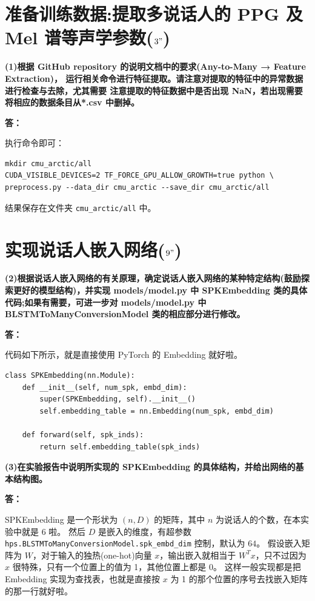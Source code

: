 \documentclass[degree=project,degree-type=project,cjk-font=noto]{thuthesis}
\begin{document}
\section{准备训练数据:提取多说话人的 PPG 及 Mel 谱等声学参数($3"$)}

\textbf{(1)根据 GitHub repository 的说明文档中的要求(Any-to-Many → Feature Extraction)， 运行相关命令进行特征提取。请注意对提取的特征中的异常数据进行检查与去除，尤其需要 注意提取的特征数据中是否出现 NaN，若出现需要将相应的数据条目从*.csv 中删掉。}

\textbf{答：}

执行命令即可：

  \begin{verbatim}
mkdir cmu_arctic/all
CUDA_VISIBLE_DEVICES=2 TF_FORCE_GPU_ALLOW_GROWTH=true python \
preprocess.py --data_dir cmu_arctic --save_dir cmu_arctic/all
\end{verbatim}

结果保存在文件夹 \texttt{cmu\_arctic/all} 中。

\section{实现说话人嵌入网络($9"$)}

\textbf{(2)根据说话人嵌入网络的有关原理，确定说话人嵌入网络的某种特定结构(鼓励探索更好的模型结构)，并实现 models/model.py 中 SPKEmbedding 类的具体代码;如果有需要，可进一步对 models/model.py 中 BLSTMToManyConversionModel 类的相应部分进行修改。}

\textbf{答：}

代码如下所示，就是直接使用 PyTorch 的 Embedding 就好啦。

  \begin{verbatim}
class SPKEmbedding(nn.Module):
    def __init__(self, num_spk, embd_dim):
        super(SPKEmbedding, self).__init__()
        self.embedding_table = nn.Embedding(num_spk, embd_dim)

    def forward(self, spk_inds):
        return self.embedding_table(spk_inds)
\end{verbatim}

\textbf{(3)在实验报告中说明所实现的 SPKEmbedding 的具体结构，并给出网络的基本结构图。}

\textbf{答：}

SPKEmbedding 是一个形状为 $(n, D)$ 的矩阵，其中 $n$ 为说话人的个数，在本实验中就是 $6$ 啦。
然后 $D$ 是嵌入的维度，有超参数 \texttt{hps.BLSTMToManyConversionModel.spk\_embd\_dim} 控制，默认为 $64$。
假设嵌入矩阵为 $W$，对于输入的独热(one-hot)向量 $x$，输出嵌入就相当于 $W^Tx$，只不过因为 $x$ 很特殊，只有一个位置上的值为 1，其他位置上都是 0。
这样一般实现都是把 Embedding 实现为查找表，也就是直接按 $x$ 为 1 的那个位置的序号去找嵌入矩阵的那一行就好啦。
\end{document}
